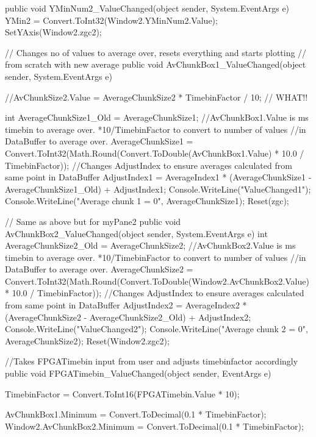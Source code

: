 {{        public void YMinNum2_ValueChanged(object sender, System.EventArgs e)
        {
            YMin2 = Convert.ToInt32(Window2.YMinNum2.Value);
            SetYAxis(Window2.zgc2);
        }

        // Changes no of values to average over, resets everything and starts plotting
        // from scratch with new average
        public void AvChunkBox1_ValueChanged(object sender, System.EventArgs e)
        {
            //AvChunkSize2.Value = AverageChunkSize2 * TimebinFactor / 10; // WHAT!!

            int AverageChunkSize1_Old = AverageChunkSize1;
            //AvChunkBox1.Value is ms timebin to average over. *10/TimebinFactor to convert to number of values 
            //in DataBuffer to average over.
            AverageChunkSize1 = Convert.ToInt32(Math.Round(Convert.ToDouble(AvChunkBox1.Value) * 10.0 / TimebinFactor));
            //Changes AdjustIndex to ensure averages calculated from same point in DataBuffer
            AdjustIndex1 = AverageIndex1 * (AverageChunkSize1 - AverageChunkSize1_Old) + AdjustIndex1;
            Console.WriteLine("ValueChanged1");
            Console.WriteLine("Average chunk 1 = {0}", AverageChunkSize1);
            Reset(zgc);
        }


        // Same as above but for myPane2
        public void AvChunkBox2_ValueChanged(object sender, System.EventArgs e)
        {
            int AverageChunkSize2_Old = AverageChunkSize2;
            //AvChunkBox2.Value is ms timebin to average over. *10/TimebinFactor to convert to number of values 
            //in DataBuffer to average over.
            AverageChunkSize2 = Convert.ToInt32(Math.Round(Convert.ToDouble(Window2.AvChunkBox2.Value) * 10.0 / TimebinFactor));
            //Changes AdjustIndex to ensure averages calculated from same point in DataBuffer
            AdjustIndex2 = AverageIndex2 * (AverageChunkSize2 - AverageChunkSize2_Old) + AdjustIndex2;
            Console.WriteLine("ValueChanged2");
            Console.WriteLine("Average chunk 2 = {0}", AverageChunkSize2);
            Reset(Window2.zgc2);
        }

        //Takes FPGATimebin input from user and adjusts timebinfactor accordingly
        public void FPGATimebin_ValueChanged(object sender, EventArgs e)
        {
            TimebinFactor = Convert.ToInt16(FPGATimebin.Value * 10);

            AvChunkBox1.Minimum = Convert.ToDecimal(0.1 * TimebinFactor);
            Window2.AvChunkBox2.Minimum = Convert.ToDecimal(0.1 * TimebinFactor);

}}}
